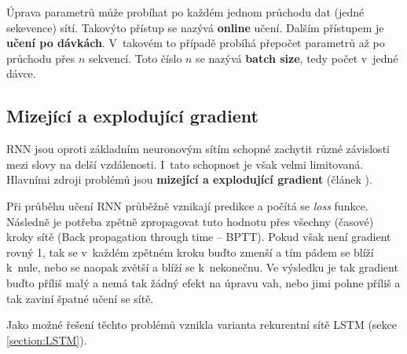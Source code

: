 Úprava parametrů může probíhat po každém jednom průchodu dat (jedné sekevence) sítí. Takovýto přístup se nazývá \textbf{online} učení. Dalším přístupem je \textbf{učení po dávkách}. V~takovém to případě probíhá přepočet parametrů až po průchodu přes $n$ sekvencí. Toto číslo $n$ se nazývá \textbf{batch size}, tedy počet  v~jedné dávce.

%
%
%


\subsection{Mizející a explodující gradient} \label{subsection:gradient}
RNN jsou oproti základním neuronovým sítím schopné zachytit různé závislosti mezi slovy na delší vzdálenosti. I~tato schopnost je však velmi limitovaná. Hlavními zdroji problémů jsou \textbf{mizející a explodující gradient} (článek \cite{gradientProblems}).


Při průběhu učení RNN průběžně vznikají predikce a počítá se \emph{loss} funkce. Následně je potřeba zpětně zpropagovat tuto hodnotu přes všechny (časové) kroky sítě (Back propagation through time -- BPTT). Pokud však není gradient rovný 1, tak se v~každém zpětném kroku buďto zmenší a tím pádem se blíží k~nule, nebo se naopak zvětší a blíží se k~nekonečnu. Ve výsledku je tak gradient buďto příliš malý a nemá tak žádný efekt na úpravu vah, nebo jimi pohne příliš a tak zaviní špatné učení se sítě.

Jako možné řešení těchto problémů vznikla varianta rekurentní sítě LSTM (sekce \ref{section:LSTM}).


